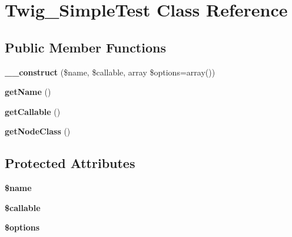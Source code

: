 \hypertarget{class_twig___simple_test}{}\section{Twig\+\_\+\+Simple\+Test Class Reference}
\label{class_twig___simple_test}
\subsection*{Public Member Functions}
\begin{DoxyCompactItemize}
\item 
\hypertarget{class_twig___simple_test_a1e24fc85f3981c10f1e71d93a4f54144}{}{\bfseries \+\_\+\+\_\+construct} (\$name, \$callable, array \$options=array())\label{class_twig___simple_test_a1e24fc85f3981c10f1e71d93a4f54144}

\item 
\hypertarget{class_twig___simple_test_a3d0963e68bb313b163a73f2803c64600}{}{\bfseries get\+Name} ()\label{class_twig___simple_test_a3d0963e68bb313b163a73f2803c64600}

\item 
\hypertarget{class_twig___simple_test_a0be839e0782a38a172c386bd963375c9}{}{\bfseries get\+Callable} ()\label{class_twig___simple_test_a0be839e0782a38a172c386bd963375c9}

\item 
\hypertarget{class_twig___simple_test_a8d85021f1f19e71dd99d7dfdd138c927}{}{\bfseries get\+Node\+Class} ()\label{class_twig___simple_test_a8d85021f1f19e71dd99d7dfdd138c927}

\end{DoxyCompactItemize}
\subsection*{Protected Attributes}
\begin{DoxyCompactItemize}
\item 
\hypertarget{class_twig___simple_test_ab2fc40d43824ea3e1ce5d86dee0d763b}{}{\bfseries \$name}\label{class_twig___simple_test_ab2fc40d43824ea3e1ce5d86dee0d763b}

\item 
\hypertarget{class_twig___simple_test_ae3d0fc9fa800751a4a5e2917209d85f2}{}{\bfseries \$callable}\label{class_twig___simple_test_ae3d0fc9fa800751a4a5e2917209d85f2}

\item 
\hypertarget{class_twig___simple_test_a011800c63ece4cbbfa77136a20607023}{}{\bfseries \$options}\label{class_twig___simple_test_a011800c63ece4cbbfa77136a20607023}

\end{DoxyCompactItemize}



